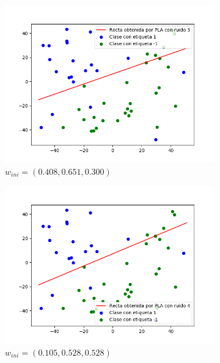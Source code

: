 \documentclass[12pt,a4paper]{article}
\begin{document}
\begin{figure}[H]
	\centering
	\begin{subfigure}{0.32\textwidth}
		\includegraphics[scale=0.37]{./Imagenes/ej2-16.png}
		\caption{$w_{ini} = (0.408,0.651,0.300)$}
	\end{subfigure}
	\begin{subfigure}{0.33\textwidth}
		\includegraphics[scale=0.37]{./Imagenes/ej2-17.png}
		\caption{$w_{ini} = (0.105,0.528,0.528)$}
	\end{subfigure}
	\begin{subfigure}{0.33\textwidth}

\end{subfigure}
\end{figure}
\end{document}
